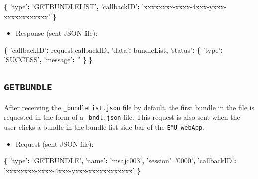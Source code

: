 \documentclass[]{book}
\newenvironment{Shaded}{\begin{snugshade}}{\end{snugshade}}
\newcommand{\AttributeTok}[1]{\textcolor[rgb]{0.77,0.63,0.00}{#1}}
\newcommand{\NormalTok}[1]{#1}
\newcommand{\OperatorTok}[1]{\textcolor[rgb]{0.81,0.36,0.00}{\textbf{#1}}}
\newcommand{\StringTok}[1]{\textcolor[rgb]{0.31,0.60,0.02}{#1}}
\newcommand{\VariableTok}[1]{\textcolor[rgb]{0.00,0.00,0.00}{#1}}
\providecommand{\tightlist}{%
  \setlength{\itemsep}{0pt}\setlength{\parskip}{0pt}}
\begin{document}
\begin{Shaded}
\begin{Highlighting}[]
\OperatorTok{\{}
  \StringTok{'type'}\OperatorTok{:} \StringTok{'GETBUNDLELIST'}\OperatorTok{,}
  \StringTok{'callbackID'}\OperatorTok{:} \StringTok{'xxxxxxxx-xxxx-4xxx-yxxx-xxxxxxxxxxxx'}
\OperatorTok{\}}
\end{Highlighting}
\end{Shaded}

\begin{itemize}
\tightlist
\item
  Response (sent JSON file):
\end{itemize}

\begin{Shaded}
\begin{Highlighting}[]
\OperatorTok{\{}
  \StringTok{'callbackID'}\OperatorTok{:} \VariableTok{request}\NormalTok{.}\AttributeTok{callbackID}\OperatorTok{,}
  \StringTok{'data'}\OperatorTok{:}\NormalTok{ bundleList}\OperatorTok{,}
  \StringTok{'status'}\OperatorTok{:} \OperatorTok{\{}
    \StringTok{'type'}\OperatorTok{:} \StringTok{'SUCCESS'}\OperatorTok{,}
    \StringTok{'message'}\OperatorTok{:} \StringTok{''}
  \OperatorTok{\}}
\OperatorTok{\}}
\end{Highlighting}
\end{Shaded}

\hypertarget{getbundle}{%
\subsection{\texorpdfstring{\texttt{GETBUNDLE}}{GETBUNDLE}}\label{getbundle}}

After receiving the \texttt{\_bundleList.json} file by default, the first bundle in the file is requested in the form of a \texttt{\_bndl.json} file. This request is also sent when the user clicks a bundle in the bundle list side bar of the \texttt{EMU-webApp}.

\begin{itemize}
\tightlist
\item
  Request (sent JSON file):
\end{itemize}

\begin{Shaded}
\begin{Highlighting}[]
\OperatorTok{\{}
  \StringTok{'type'}\OperatorTok{:} \StringTok{'GETBUNDLE'}\OperatorTok{,}
  \StringTok{'name'}\OperatorTok{:} \StringTok{'msajc003'}\OperatorTok{,}
  \StringTok{'session'}\OperatorTok{:} \StringTok{'0000'}\OperatorTok{,}
  \StringTok{'callbackID'}\OperatorTok{:} \StringTok{'xxxxxxxx-xxxx-4xxx-yxxx-xxxxxxxxxxxx'}
\OperatorTok{\}}
\end{Highlighting}
\end{Shaded}
\end{document}
